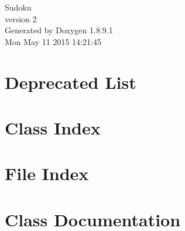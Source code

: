 \documentclass[twoside]{book}
\newcommand{\+}{\discretionary{\mbox{\scriptsize$\hookleftarrow$}}{}{}}
\newcommand{\clearemptydoublepage}{%
  \newpage{\pagestyle{empty}\cleardoublepage}%
}
\begin{document}
\hypersetup{pageanchor=false,
             bookmarks=true,
             bookmarksnumbered=true,
             pdfencoding=unicode
            }
\begin{titlepage}
\vspace*{7cm}
\begin{center}%
{\Large Sudoku \\[1ex]\large version 2 }\\
\vspace*{1cm}
{\large Generated by Doxygen 1.8.9.1}\\
\vspace*{0.5cm}
{\small Mon May 11 2015 14:21:45}\\
\end{center}
\end{titlepage}
\clearemptydoublepage
\tableofcontents
\clearemptydoublepage
{}
\hypersetup{pageanchor=true}

\chapter{Deprecated List}
\label{deprecated}
\hypertarget{deprecated}{}

\chapter{Class Index}

\chapter{File Index}

\chapter{Class Documentation}













































\end{document}
